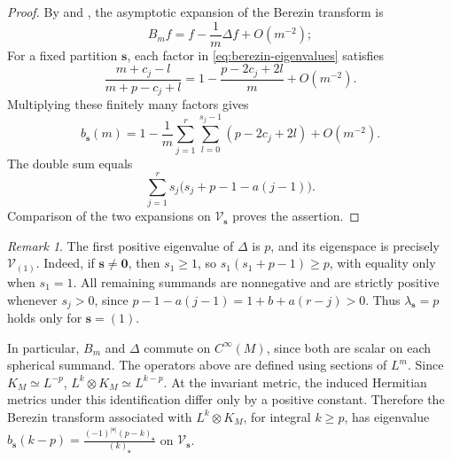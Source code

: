 \documentclass[11pt,reqno]{amsart}
\theoremstyle{corollary}
\theoremstyle{conjecture}
\theoremstyle{assumption}
\theoremstyle{proposition}
\theoremstyle{remark}
\newtheorem{remark}[theorem]{Remark}
\numberwithin{equation}{section}
\begin{document}
\begin{proof}
By \cite{Englis2000} and \cite[Theorem~7.2]{Schlichenmaier2010}, the asymptotic expansion of the Berezin transform is
 \[
B_mf=f-\frac1m\Delta f+O(m^{-2});
\]
For a fixed partition $\mathbf s$, each factor in \eqref{eq:berezin-eigenvalues} satisfies
\[
\frac{m+c_j-l}{m+p-c_j+l}=1-\frac{p-2c_j+2l}{m}+O(m^{-2}).
\]
Multiplying these finitely many factors gives
\[
b_{\mathbf s}(m)=1-\frac1m\sum_{j=1}^r\sum_{l=0}^{s_j-1}(p-2c_j+2l)+O(m^{-2}).
\]
The double sum equals
\[
\sum_{j=1}^rs_j\bigl(s_j+p-1-a(j-1)\bigr).
\]
Comparison of the two expansions on $\mathcal V_{\mathbf s}$ proves the assertion.
\end{proof}

\begin{remark}
The first positive eigenvalue of $\Delta$ is $p$, and its eigenspace is precisely $\mathcal V_{(1)}$. Indeed, if $\mathbf s\ne\mathbf0$, then $s_1\geq1$, so $s_1(s_1+p-1)\geq p$, with equality only when $s_1=1$. All remaining summands are nonnegative and are strictly
positive whenever $s_j>0$, since $p-1-a(j-1)=1+b+a(r-j)>0$. Thus $\lambda_{\mathbf s}=p$ holds only for $\mathbf s=(1)$.
\end{remark}

In particular, $B_m$ and $\Delta$ commute on $C^\infty(M)$, since both are scalar on each spherical summand. The operators above are defined using sections of $L^m$. Since $K_M\simeq L^{-p}$, $L^k\otimes K_M\simeq L^{k-p}$. At the invariant metric, the induced Hermitian metrics under this identification differ only by a positive constant. Therefore the Berezin transform associated with $L^k\otimes K_M$, for integral $k\geq p$, has eigenvalue $b_{\mathbf s}(k-p)=\frac{(-1)^{|\mathbf s|}(p-k)_{\mathbf s}}{(k)_{\mathbf s}}$ on $\mathcal V_{\mathbf s}$.
\end{document}
